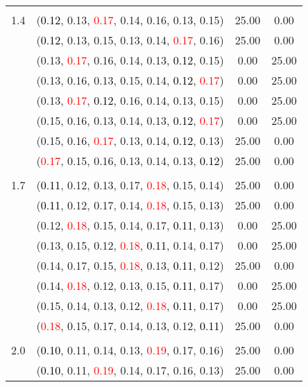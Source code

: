\documentclass[10pt,a4paper]{report}
\begin{document}
\begin{center}
\begin{longtable}{clcc}
		&&&\\
		1.4			&(\textcolor{black}{0.12}, 0.13, \textcolor{red}{0.17}, 0.14, 0.16, 0.13, 0.15)&25.00&0.00\\
			&(\textcolor{black}{0.12}, 0.13, 0.15, 0.13, 0.14, \textcolor{red}{0.17}, 0.16)&25.00&0.00\\
			&(0.13, \textcolor{red}{0.17}, 0.16, 0.14, 0.13, \textcolor{black}{0.12}, 0.15)&0.00&25.00\\
			&(0.13, 0.16, 0.13, 0.15, 0.14, \textcolor{black}{0.12}, \textcolor{red}{0.17})&0.00&25.00\\
			&(0.13, \textcolor{red}{0.17}, \textcolor{black}{0.12}, 0.16, 0.14, 0.13, 0.15)&0.00&25.00\\
			&(0.15, 0.16, 0.13, 0.14, 0.13, \textcolor{black}{0.12}, \textcolor{red}{0.17})&0.00&25.00\\
			&(0.15, 0.16, \textcolor{red}{0.17}, 0.13, 0.14, \textcolor{black}{0.12}, 0.13)&25.00&0.00\\
			&(\textcolor{red}{0.17}, 0.15, 0.16, 0.13, 0.14, 0.13, \textcolor{black}{0.12})&25.00&0.00\\
		&&&\\
		1.7			&(\textcolor{black}{0.11}, 0.12, 0.13, 0.17, \textcolor{red}{0.18}, 0.15, 0.14)&25.00&0.00\\
			&(\textcolor{black}{0.11}, 0.12, 0.17, 0.14, \textcolor{red}{0.18}, 0.15, 0.13)&25.00&0.00\\
			&(0.12, \textcolor{red}{0.18}, 0.15, 0.14, 0.17, \textcolor{black}{0.11}, 0.13)&0.00&25.00\\
			&(0.13, 0.15, 0.12, \textcolor{red}{0.18}, \textcolor{black}{0.11}, 0.14, 0.17)&0.00&25.00\\
			&(0.14, 0.17, 0.15, \textcolor{red}{0.18}, 0.13, \textcolor{black}{0.11}, 0.12)&25.00&0.00\\
			&(0.14, \textcolor{red}{0.18}, 0.12, 0.13, 0.15, \textcolor{black}{0.11}, 0.17)&0.00&25.00\\
			&(0.15, 0.14, 0.13, 0.12, \textcolor{red}{0.18}, \textcolor{black}{0.11}, 0.17)&0.00&25.00\\
			&(\textcolor{red}{0.18}, 0.15, 0.17, 0.14, 0.13, 0.12, \textcolor{black}{0.11})&25.00&0.00\\
		&&&\\
		2.0			&(\textcolor{black}{0.10}, 0.11, 0.14, 0.13, \textcolor{red}{0.19}, 0.17, 0.16)&25.00&0.00\\
			&(\textcolor{black}{0.10}, 0.11, \textcolor{red}{0.19}, 0.14, 0.17, 0.16, 0.13)&25.00&0.00\\

\end{longtable}
\end{center}
\end{document}
